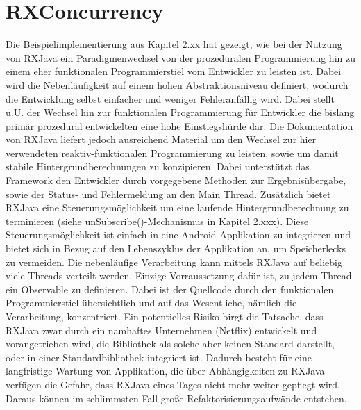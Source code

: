 \documentclass[12pt,oneside,a4paper,bibtotoc,liststotoc]{scrreprt}
\begin{document}
\section{RXConcurrency}
Die Beispielimplementierung aus Kapitel 2.xx hat gezeigt, wie bei der Nutzung von RXJava ein Paradigmenwechsel von der prozeduralen Programmierung hin zu einem eher funktionalen Programmierstiel vom Entwickler zu leisten ist. Dabei wird die Nebenläufigkeit auf einem hohen Abstraktionsniveau definiert, wodurch die Entwicklung selbst einfacher und weniger Fehleranfällig wird. Dabei stellt u.U. der Wechsel hin zur funktionalen Programmierung für Entwickler die bislang primär prozedural entwickelten eine hohe Einstiegshürde dar. Die Dokumentation von RXJava liefert jedoch ausreichend Material um den Wechsel zur hier verwendeten reaktiv-funktionalen Programmierung zu leisten, sowie um damit stabile Hintergrundberechnungen zu konzipieren. Dabei unterstützt das Framework den Entwickler durch vorgegebene Methoden zur Ergebnisübergabe, sowie der Status- und Fehlermeldung an den Main Thread. Zusätzlich bietet RXJava eine Steuerungsmöglichkeit um eine laufende Hintergrundberechnung zu terminieren (siehe unSubscribe()-Mechanismus in Kapitel 2.xxx). Diese Steuerungsmöglichkeit ist einfach in eine Android Applikation zu integrieren und bietet sich in Bezug auf den Lebenszyklus der Applikation an, um Speicherlecks zu vermeiden. Die nebenläufige Verarbeitung kann mittels RXJava auf beliebig viele Threads verteilt werden. Einzige Vorraussetzung dafür ist, zu jedem Thread ein Observable zu definieren. Dabei ist der Quellcode durch den funktionalen Programmierstiel übersichtlich und auf das Wesentliche, nämlich die Verarbeitung, konzentriert.\newline
Ein potentielles Risiko birgt die Tatsache, dass RXJava zwar durch ein namhaftes Unternehmen (Netflix) entwickelt und vorangetrieben wird, die Bibliothek als solche aber keinen Standard darstellt, oder in einer Standardbibliothek integriert ist. Dadurch besteht für eine langfristige Wartung von Applikation, die über Abhängigkeiten zu RXJava verfügen die Gefahr, dass RXJava eines Tages nicht mehr weiter gepflegt wird. Daraus können im schlimmsten Fall große Refaktorisierungsaufwände entstehen.
\end{document}
